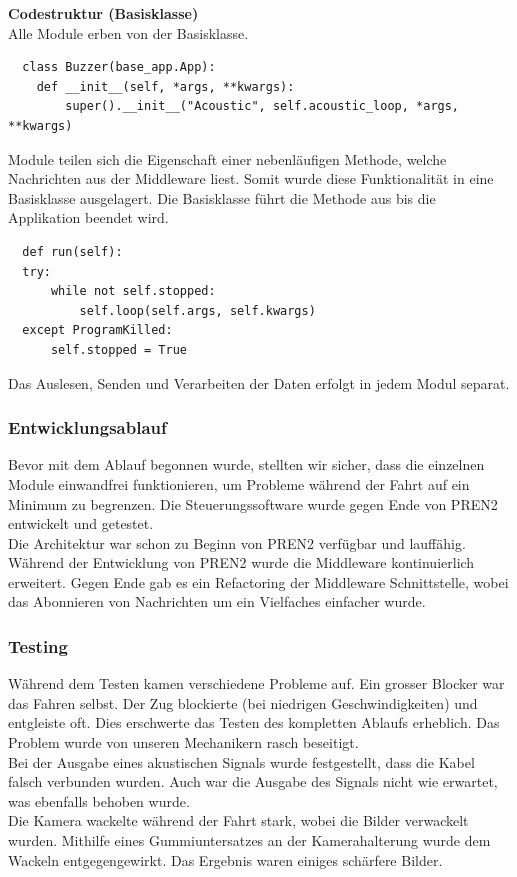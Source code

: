 \documentclass[../../main.tex]{subfiles}
\begin{document}
\pagebreak

\textbf{Codestruktur (Basisklasse)} \\
Alle Module erben von der Basisklasse.\\
\begin{lstlisting}
  class Buzzer(base_app.App):
    def __init__(self, *args, **kwargs):
        super().__init__("Acoustic", self.acoustic_loop, *args, **kwargs)
\end{lstlisting}
Module teilen sich die Eigenschaft einer nebenläufigen Methode, welche Nachrichten aus der Middleware liest. Somit wurde diese Funktionalität in eine Basisklasse ausgelagert. Die Basisklasse führt die Methode aus bis die Applikation beendet wird.\\
\begin{lstlisting}
  def run(self):
  try:
      while not self.stopped:
          self.loop(self.args, self.kwargs)
  except ProgramKilled:
      self.stopped = True
\end{lstlisting}
Das Auslesen, Senden und Verarbeiten der Daten erfolgt in jedem Modul separat.

\subsubsection{Entwicklungsablauf}
Bevor mit dem Ablauf begonnen wurde, stellten wir sicher, dass die einzelnen Module einwandfrei funktionieren, um Probleme während der Fahrt auf ein Minimum zu begrenzen. Die Steuerungssoftware wurde gegen Ende von PREN2 entwickelt und getestet. \\

Die Architektur war schon zu Beginn von PREN2 verfügbar und lauffähig. Während der Entwicklung von PREN2 wurde die Middleware kontinuierlich erweitert. Gegen Ende gab es ein Refactoring der Middleware Schnittstelle, wobei das Abonnieren von Nachrichten um ein Vielfaches einfacher wurde.

\subsubsection{Testing}
Während dem Testen kamen verschiedene Probleme auf. Ein grosser Blocker war das Fahren selbst. Der Zug blockierte (bei niedrigen Geschwindigkeiten) und entgleiste oft. Dies erschwerte das Testen des kompletten Ablaufs erheblich. Das Problem wurde von unseren Mechanikern rasch beseitigt. \\

Bei der Ausgabe eines akustischen Signals wurde festgestellt, dass die Kabel falsch verbunden wurden. Auch war die Ausgabe des Signals nicht wie erwartet, was ebenfalls behoben wurde. \\

Die Kamera wackelte während der Fahrt stark, wobei die Bilder verwackelt wurden. Mithilfe eines Gummiuntersatzes an der Kamerahalterung wurde dem Wackeln entgegengewirkt. Das Ergebnis waren einiges schärfere Bilder.
\end{document}
